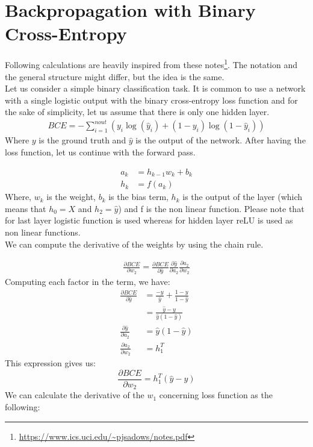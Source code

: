 \documentclass[a4paper, nobind]{templates/ociamthesis}
\begin{document}
\startappendices

\hypertarget{chap:appendix_a}{%
\chapter{Backpropagation with Binary Cross-Entropy}\label{chap:appendix_a}}

Following calculations are heavily inspired from these notes\footnote{\url{https://www.ics.uci.edu/~pjsadows/notes.pdf}}. The notation and the general structure might differ, but the idea is the same.\\
Let us consider a simple binary classification task. It is common to use a network with a single logistic output with the binary cross-entropy loss function and for the sake of simplicity, let us assume that there is only one hidden layer.
\[
\begin{aligned}
BCE=-\sum_{i=1}^{n o u t}\left(y_i \log \left(\hat{y}_i \right)+\left(1-y_i\right) \log \left(1-\hat{y}_i\right)\right)
\end{aligned}
\]
\noindent Where \(y\) is the ground truth and \(\hat{y}\) is the output of the network. After having the loss function, let us continue with the forward pass.

\[
\begin{aligned} 
a_{k} &= h_{k-1} w_{k} + b_k \\
h_k &= f(a_{k})
\end{aligned}
\]
\noindent Where, \(w_k\) is the weight, \(b_{k}\) is the bias term, \(h_k\) is the output of the layer (which means that \(h_0 = X\) and \(h_2 = \hat{y}\)) and f is the non linear function. Please note that for last layer logistic function is used whereas for hidden layer reLU is used as non linear functions.\\
We can compute the derivative of the weights by using the chain rule.

\[
\begin{aligned} 
\frac{\partial BCE}{\partial w_{2}}=\frac{\partial BCE}{\partial \hat{y}} \frac{\partial \hat{y}}{\partial a_{2}} \frac{\partial a_{2}}{\partial w_{2}}
\end{aligned}
\]
\noindent Computing each factor in the term, we have:
\[
\begin{aligned}
\frac{\partial BCE}{\partial \hat{y}} &=\frac{-y}{\hat{y}}+\frac{1-y}{1-\hat{y}} \\
&=\frac{\hat{y}-y}{\hat{y}\left(1-\hat{y}\right)} \\
\frac{\partial \hat{y}}{\partial a_{2}} &=\hat{y}\left(1-\hat{y}\right) \\
\frac{\partial a_{2}}{\partial w_{2}} &=h_{1}^T
\end{aligned}
\]
This expression gives us:
\[
\frac{\partial BCE}{\partial w_{2}}=h_{1}^T\left(\hat{y}-y\right)
\]
We can calculate the derivative of the \(w_1\) concerning loss function as the following:
\end{document}
